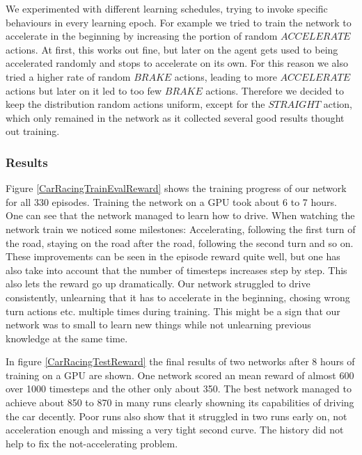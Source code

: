 \documentclass[
        a4paper,
        10pt,
        parskip = full,    %
    ]{scrartcl}
\begin{document}
We experimented with different learning schedules, trying to invoke specific
behaviours in every learning epoch. For example we tried to train the network
to accelerate in the beginning by increasing the portion of random $ACCELERATE$
actions. At first, this works out fine, but later on the agent gets used
to being accelerated randomly and stops to accelerate on its own. For this reason
we also tried a higher rate of random $BRAKE$ actions, leading to more $ACCELERATE$
actions but later on it led to too few $BRAKE$ actions. Therefore we decided to
keep the distribution random actions uniform, except for the $STRAIGHT$ action,
which only remained in the network as it collected several good results thought
out training.

\subsubsection{Results}

Figure \ref{CarRacingTrainEvalReward} shows the training progress of our network
for all 330 episodes. Training the network on a GPU took about 6 to 7 hours.
One can see that the network managed to learn how to drive. When watching the
network train we noticed some milestones: Accelerating, following the
first turn of the road, staying on the road after the road, following the second
turn and so on. These improvements can be seen in the episode reward quite well,
but one has also take into account that the number of timesteps increases step
by step. This also lets the reward go up dramatically. Our network struggled to
drive consistently, unlearning that it has to accelerate in the beginning, chosing
wrong turn actions etc. multiple times during training. This might be a sign that
our network was to small to learn new things while not unlearning previous
knowledge at the same time.

In figure \ref{CarRacingTestReward} the final results of two networks after 8
hours of training on a GPU are shown. One network scored an mean reward of almost
600 over 1000 timesteps and the other only about 350.
The best network managed to achieve about 850 to 870 in many runs clearly showning
its capabilities of driving the car decently. Poor runs also show that it struggled
in two runs early on, not acceleration enough and missing a very tight second
curve. The history did not help to fix the not-accelerating problem.
\end{document}
